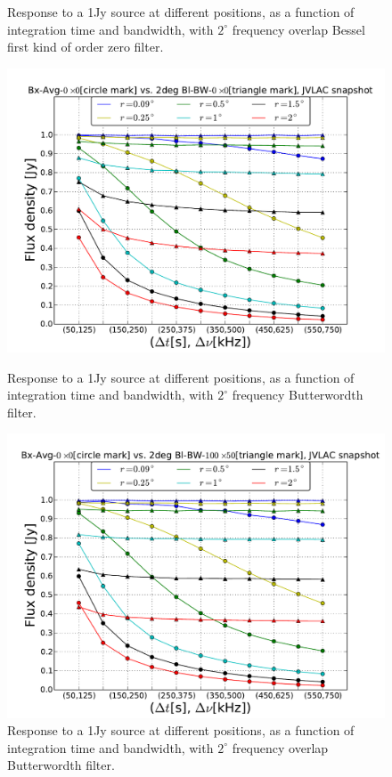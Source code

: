\documentclass[useAMS,usenatbib]{mn2e}
\begin{document}
\begin{figure}
\begin{minipage}{0.36\linewidth}
      \caption{Response to a 1Jy source at different positions, as a function of integration time and bandwidth, with $2^{\circ}$ frequency 
overlap Bessel first kind of order zero filter.}
  \label{fig:max-integ-timefreq-bessel-w100x50-fov2}\end{minipage}
\begin{minipage}{0.36\linewidth}\includegraphics[width=1\textwidth]{./Figures/max-integ-timefreq-butter-w1x1-fov2.pdf}
      \caption{Response to a 1Jy source at different positions, as a function of integration time and bandwidth, with $2^{\circ}$ frequency 
Butterwordth filter.}
      \label{fig:max-integ-timefreq-butter-w1x1-fov2}\end{minipage}
\hspace{1cm}
\begin{minipage}{0.36\linewidth}\includegraphics[width=1\textwidth]{./Figures/max-integ-timefreq-butter-w100x50-fov2.pdf}
      \caption{Response to a 1Jy source at different positions, as a function of integration time and bandwidth, with $2^{\circ}$ frequency 
overlap Butterwordth filter.}
  \label{fig:max-integ-timefreq-butter-w100x50-fov2}\end{minipage}
\end{figure}
\end{document}
